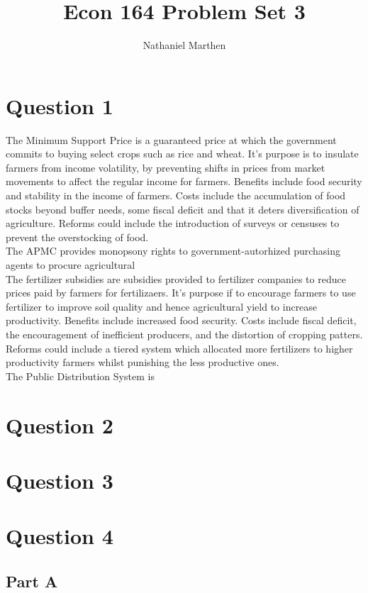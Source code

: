 \documentclass{article}
\title{Econ 164 Problem Set 3}
\author{Nathaniel Marthen}
\theoremstyle{mytheoremstyle}
\theoremstyle{mytheoremstyle}
\theoremstyle{myproblemstyle}
\begin{document}
    \maketitle
    
    \section*{Question 1}
    The Minimum Support Price is a guaranteed price at which the government commits to buying select crops such as rice and wheat.
    It's purpose is to insulate farmers from income volatility, by preventing shifts in prices from market movements to affect the regular income for farmers.
    Benefits include food security and stability in the income of farmers.
    Costs include the accumulation of food stocks beyond buffer needs, some fiscal deficit and that it deters diversification of agriculture.
    Reforms could include the introduction of surveys or censuses to prevent the overstocking of food.\\

    The APMC provides monopsony rights to government-autorhized purchasing agents to procure agricultural\\

    The fertilizer subsidies are subsidies provided to fertilizer companies to reduce prices paid by farmers for fertilizaers.
    It's purpose if to encourage farmers to use fertilizer to improve soil quality and hence agricultural yield to increase productivity.
    Benefits include increased food security.
    Costs include fiscal deficit, the encouragement of inefficient producers, and the distortion of cropping patters. 
    Reforms could include a tiered system which allocated more fertilizers to higher productivity farmers whilst punishing the less productive ones.\\
    
    The Public Distribution System is 
    \section*{Question 2}
    \section*{Question 3}
    \section*{Question 4}
    \subsection*{Part A}
\end{document}
